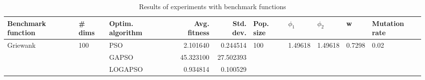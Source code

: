 \begin{table}
\centering
\caption{Results of experiments with benchmark functions}
\begin{tabular}{lllrrlllll}
\toprule
       Benchmark function &              \# dims & Optim. algorithm &  Avg. fitness &  Std. dev. &            Pop. size &               $\phi_{1}$ &               $\phi_{2}$ &                       w &         Mutation rate \\
\midrule
\multirow{3}{*}{Griewank} & \multirow{3}{*}{100} &              PSO &      2.101640 &   0.244514 & \multirow{3}{*}{100} & \multirow{3}{*}{1.49618} & \multirow{3}{*}{1.49618} & \multirow{3}{*}{0.7298} & \multirow{3}{*}{0.02} \\
                          &                      &            GAPSO &     45.323100 &  27.502393 &                      &                          &                          &                         &                       \\
                          &                      &          LOGAPSO &      0.934814 &   0.100529 &                      &                          &                          &                         &                       \\
\bottomrule
\end{tabular}
\end{table}
